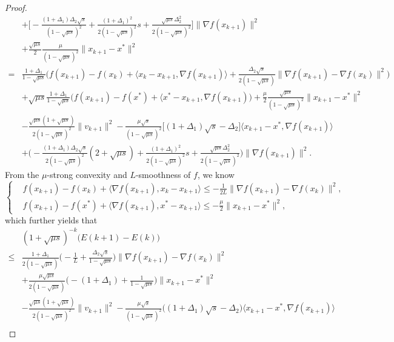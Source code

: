 \documentclass[10pt,a4paper]{amsart}
\begin{document}
\begin{proof}
{\begin{align*}
        &+\big[-\frac{(1+\Delta_1)\Delta_2\sqrt{s}}{(1-\sqrt{\mu s})^2}+\frac{(1+\Delta_1)^2}{2(1-\sqrt{\mu s})^2}s+\frac{\sqrt{\mu s}\Delta_2^2}{2(1-\sqrt{\mu s})^2}\big]\|\nabla f(x_{k+1})\|^2\\
        &+\frac{\sqrt{\mu s}}{2}\frac{\mu}{(1-\sqrt{\mu s})^2}\|x_{k+1}-x^*\|^2\\
        =&\frac{1+\Delta_1}{1-\sqrt{\mu s}}\big(f(x_{k+1})-f(x_k)+\langle x_k-x_{k+1}, \nabla f(x_{k+1})\rangle + \frac{\Delta_2\sqrt{s}}{2(1-\sqrt{\mu s})}\|\nabla f(x_{k+1})-\nabla f(x_k)\|^2\big)\\
        &+\sqrt{\mu s}\frac{1+\Delta_1}{1-\sqrt{\mu s}}\big(f(x_{k+1})-f(x^*)+\langle x^*-x_{k+1}, \nabla f(x_{k+1})\big)+\frac{\mu}{2}\frac{\sqrt{\mu s}}{(1-\sqrt{\mu s})^2}\|x_{k+1}-x^*\|^2\\
        &-\frac{\sqrt{\mu s}(1+\sqrt{\mu s})}{2(1-\sqrt{\mu s})^2}\|v_{k+1}\|^2-\frac{\mu\sqrt{s}}{(1-\sqrt{\mu s})^2}\big[(1+\Delta_1)\sqrt{s}-\Delta_2\big]\langle x_{k+1}-x^*, \nabla f(x_{k+1})\rangle\\
        &+\big(-\frac{(1+\Delta_1)\Delta_2\sqrt{s}}{2(1-\sqrt{\mu s})^2}(2+\sqrt{\mu s})+\frac{(1+\Delta_1)^2}{2(1-\sqrt{\mu s})^2}s+\frac{\sqrt{\mu s}\Delta_2^2}{2(1-\sqrt{\mu s})^2}\big)\|\nabla f(x_{k+1})\|^2.
       \end{align*}
    }
    From the $\mu$-strong convexity and $L$-smoothness of $f$, we know 
	\begin{equation*}
		\left\{
		\begin{aligned}
			&f(x_{k+1})-f(x_k)+\langle \nabla f(x_{k+1}),x_k-x_{k+1}\rangle \leqslant -\frac{1}{2L}\|\nabla f(x_{k+1})-\nabla f(x_k)\|^2,\\
			&f(x_{k+1})-f(x^*)+\langle \nabla f(x_{k+1}),x^*-x_{k+1}\rangle\leqslant -\frac{\mu}{2}\|x_{k+1}-x^*\|^2,
		\end{aligned}
		\right.
	\end{equation*}
which further yields that
{
        \begin{align*}
            &(1+\sqrt{\mu s})^{-k}\big(E(k+1)-E(k)\big)\\
            \leqslant & \frac{1+\Delta_1}{2(1-\sqrt{\mu s})}\big(-\frac{1}{L}+\frac{\Delta_2\sqrt{s}}{1-\sqrt{\mu s}}\big)\|\nabla f(x_{k+1})-\nabla f(x_{k})\|^2\\
            &+\frac{\mu\sqrt{\mu s}}{2(1-\sqrt{\mu s})}\big(-(1+\Delta_1)+\frac{1}{1-\sqrt{\mu s}}\big)\|x_{k+1}-x^*\|^2\\
            &-\frac{\sqrt{\mu s}(1+\sqrt{\mu s})}{2(1-\sqrt{\mu s})^2}\|v_{k+1}\|^2-\frac{\mu\sqrt{s}}{(1-\sqrt{\mu s})^2}\big((1+\Delta_1)\sqrt{s}-\Delta_2\big)\langle x_{k+1}-x^*,\nabla f(x_{k+1})\rangle\\

\end{align*}}
\end{proof}
\end{document}

